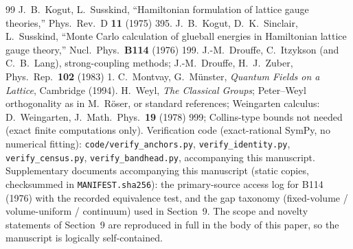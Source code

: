 \documentclass[11pt]{article}
\begin{document}
\begin{thebibliography}{99}
 J.~B.~Kogut, L.~Susskind, ``Hamiltonian formulation of
lattice gauge theories,'' Phys.\ Rev.\ D \textbf{11} (1975) 395.
 J.~B.~Kogut, D.~K.~Sinclair, L.~Susskind, ``Monte Carlo
calculation of glueball energies in Hamiltonian lattice gauge theory,''
Nucl.\ Phys.\ \textbf{B114} (1976) 199.
 J.-M.~Drouffe, C.~Itzykson (and C.~B.~Lang), strong-coupling
methods; J.-M.~Drouffe, H.~J.~Zuber, Phys.\ Rep.\ \textbf{102} (1983) 1.
 C.~Montvay, G.~M\"unster, \emph{Quantum Fields on a
Lattice}, Cambridge (1994).
 H.~Weyl, \emph{The Classical Groups}; Peter--Weyl
orthogonality as in M.~R\"oser, or standard references; Weingarten calculus:
D.~Weingarten, J.\ Math.\ Phys.\ \textbf{19} (1978) 999; Collins-type bounds
not needed (exact finite computations only).
 Verification code (exact-rational SymPy, no numerical
fitting): \texttt{code/verify\_anchors.py}, \texttt{verify\_identity.py},
\texttt{verify\_census.py}, \texttt{verify\_bandhead.py}, accompanying this
manuscript.
 Supplementary documents accompanying this manuscript
(static copies, checksummed in \texttt{MANIFEST.sha256}): the primary-source
access log for \textsc{B114} (1976) with the recorded equivalence test, and
the gap taxonomy (fixed-volume / volume-uniform / continuum) used in
Section~9. The scope and novelty statements of Section~9 are reproduced in
full in the body of this paper, so the manuscript is logically
self-contained.
\end{thebibliography}


\end{document}
